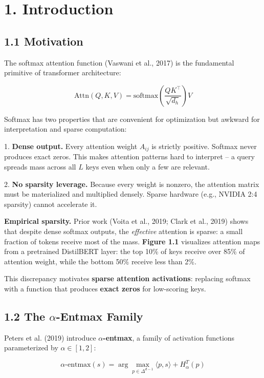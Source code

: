 
\section{1. Introduction}

\subsection{1.1 Motivation}

The softmax attention function (Vaswani et al., 2017) is the fundamental 
primitive of transformer architecture:

\[
\text{Attn}(Q, K, V) = \text{softmax}\!\left(\frac{Q K^\top}{\sqrt{d_h}}\right) V
\tag{1.1}
\]

Softmax has two properties that are convenient for optimization but awkward 
for interpretation and sparse computation:

1. \textbf{Dense output.} Every attention weight $A_{ij}$ is strictly positive. 
   Softmax never produces exact zeros. This makes attention patterns hard 
   to interpret -- a query spreads mass across all $L$ keys even when only 
   a few are relevant.

2. \textbf{No sparsity leverage.} Because every weight is nonzero, the attention 
   matrix must be materialized and multiplied densely. Sparse hardware 
   (e.g., NVIDIA 2:4 sparsity) cannot accelerate it.

\textbf{Empirical sparsity.} Prior work (Voita et al., 2019; Clark et al., 2019) 
shows that despite dense softmax outputs, the \textit{effective} attention is sparse: 
a small fraction of tokens receive most of the mass. \textbf{Figure 1.1} visualizes 
attention maps from a pretrained DistilBERT layer: the top 10\% of keys receive 
over 85\% of attention weight, while the bottom 50\% receive less than 2\%.

This discrepancy motivates \textbf{sparse attention activations}: replacing softmax 
with a function that produces \textbf{exact zeros} for low-scoring keys.

\subsection{1.2 The $\alpha$-Entmax Family}

Peters et al. (2019) introduce \textbf{$\alpha$-entmax}, a family of activation functions 
parameterized by $\alpha \in [1, 2]$:

\[
\text{$\alpha$-entmax}(s) = \arg\max_{p \in \Delta^{d-1}} \langle p, s \rangle + H_\alpha^T(p)
\tag{1.2}
\]

